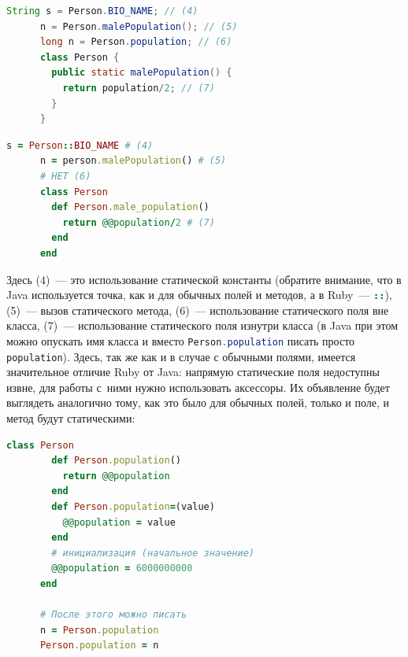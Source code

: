 \documentclass[a4paper, 14pt, titlepage]{extarticle}
\newenvironment{halfpage}%
    {\noindent\begin{minipage}[h]{0.49\linewidth}} %
    {\end{minipage}\hfill}
\newcommand{\inlinecode}[2][Java]{\lstinline[basicstyle=\ttfamily, language=#1]{#2}}
\begin{document}
  \begin{halfpage}
    \begin{lstlisting}[language=Java, title={Использование static'ов в Java}, gobble=6, texcl]
      String s = Person.BIO_NAME; // (4)
      n = Person.malePopulation(); // (5)
      long n = Person.population; // (6)
      class Person {
        public static malePopulation() {
          return population/2; // (7)
        }
      }
    \end{lstlisting}
  \end{halfpage}
  \begin{halfpage}
    \begin{lstlisting}[language=Ruby, title={Использование static'ов в Ruby}, gobble=6, texcl]
      s = Person::BIO_NAME # (4)
      n = person.malePopulation() # (5)
      # НЕТ (6)
      class Person
        def Person.male_population()
          return @@population/2 # (7)
        end
      end
    \end{lstlisting}
  \end{halfpage}
  
  Здесь (4)~--- это использование статической константы (обратите внимание, что в Java используется
  точка, как и для обычных полей и методов, а в Ruby~--- \inlinecode[Ruby]{::}), (5)~--- вызов
  статического метода, (6)~--- использование статического поля вне класса, (7)~--- использование
  статического поля изнутри класса (в Java при этом можно опускать имя класса и вместо
  \inlinecode{Person.population} писать просто \inlinecode{population}). Здесь, так же как и в
  случае с обычными полями, имеется значительное отличие Ruby от Java: напрямую статические поля
  недоступны извне, для работы с~ними нужно использовать аксессоры. Их объявление будет выглядеть
  аналогично тому, как это было для обычных полей, только и поле, и метод будут статическими:

  \begin{center}
  \begin{halfpage}
    \begin{lstlisting}[language=Ruby, title={Статические аксессоры в Ruby}, gobble=6, texcl]
      class Person
        def Person.population()
          return @@population
        end
        def Person.population=(value)
          @@population = value
        end
        # инициализация (начальное значение)
        @@population = 6000000000
      end

      # После этого можно писать
      n = Person.population
      Person.population = n
    \end{lstlisting}
  \end{halfpage}
  \end{center}
\end{document}
